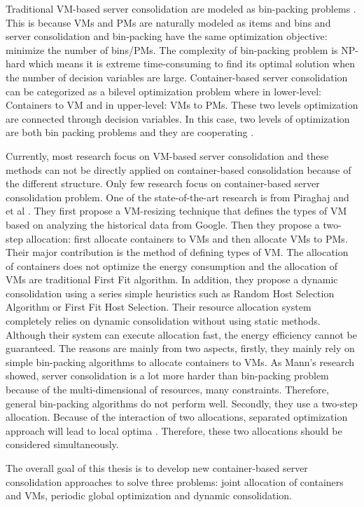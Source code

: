 Traditional VM-based server consolidation are modeled as bin-packing problems \cite{Mann:2015ua}. This is because VMs and PMs are naturally modeled as items and bins and server consolidation and bin-packing have the same optimization objective: minimize the number of bins/PMs. The complexity of bin-packing problem is NP-hard which means it is extreme time-consuming to find its optimal solution when the number of decision variables are large. Container-based server consolidation can be categorized as a bilevel optimization problem \cite{Colson:2007bu} where in lower-level: Containers to VM and in upper-level: VMs to PMs. These two levels optimization are connected through decision variables. In this case, two levels of optimization are both bin packing problems and they are cooperating \cite{Legillon:2012dd}.

Currently, most research focus on VM-based server consolidation and these methods can not be directly applied on container-based consolidation because of the different structure. Only few research focus on container-based server consolidation problem. One of the state-of-the-art research is from Piraghaj and et al \cite{Piraghaj:2015uf}. They first propose a VM-resizing technique that defines the types of VM based on analyzing the historical data from Google. Then they propose a two-step allocation: first allocate containers to VMs and then allocate VMs to PMs. Their major contribution is the method of defining types of VM. The allocation of containers does not optimize the energy consumption and the allocation of VMs are traditional First Fit algorithm. In addition, they propose a dynamic consolidation \cite{Piraghaj:2016bw} using a series simple heuristics such as Random Host Selection Algorithm or First Fit Host Selection. 
Their resource allocation system completely relies on dynamic consolidation without using static methods. Although their system can execute allocation fast, the energy efficiency cannot be guaranteed.
The reasons are mainly from two aspects, firstly, they mainly rely on simple bin-packing algorithms to allocate containers to VMs. As Mann's research \cite{Mann:2015ua} showed, server consolidation is a lot more harder than bin-packing problem because of the multi-dimensional of resources, many constraints. Therefore, general bin-packing algorithms do not perform well. Secondly, they use a two-step allocation. Because of the interaction of two allocations, separated optimization approach will lead to local optima \cite{Mann:2016hx}. Therefore, these two allocations should be considered simultaneously.

The overall goal of this thesis is to develop new container-based server consolidation approaches to solve three problems: joint allocation of containers  and VMs, periodic global optimization and dynamic consolidation. 

